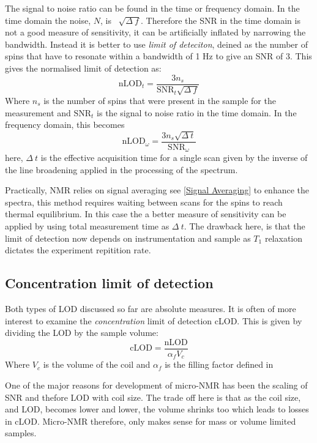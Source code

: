 The signal to noise ratio can be found in the time or frequency domain. In the time domain the noise, $N$, is
~$\sqrt{\Delta~f}$. Therefore the SNR in the time domain is not a good measure of sensitivity, it can be
artificially inflated by narrowing the bandwidth. Instead it is better to use \textit{limit of deteciton}, deined as
the number of spins that have to resonate within a bandwidth of 1 Hz to give an SNR of 3. This gives
the normalised limit of detection as\citep{Badilita:2011td}:
\begin{equation}
  \text{nLOD}_{t} = \frac{3n_s}{\text{SNR}_{t}\sqrt{\Delta~f}}
\end{equation}
Where $n_s$ is the number of spins that were present in the sample for the measurement and $\text{SNR}_t$ is the
signal to noise ratio in the time domain.
In the frequency domain, this becomes
\begin{equation}\label{eqn:nLOD}
  \text{nLOD}_\omega = \frac{3n_s\sqrt{\Delta~t}}{\text{SNR}_\omega}
\end{equation}
here, $\Delta~t$ is the effective acquisition time for a single scan given by the inverse of the
line broadening applied in the processing of the spectrum.

Practically, NMR relies on signal averaging see \ref{Signal Averaging} to enhance the spectra, this
method requires waiting between scans for the spins to reach thermal equilibrium. In
this case the a better measure of sensitivity can be applied by using total measurement time
as $\Delta~t$. The drawback here, is that the limit of detection now depends on instrumentation
and sample as $T_1$ relaxation dictates the experiment repitition rate.

\subsection{Concentration limit of detection}

Both types of LOD discussed so far are absolute measures. It is often of more
interest to examine the \textit{concentration} limit of detection cLOD. This is given by
dividing the LOD by the sample volume:
\begin{equation}\label{eqn:cLOD}
  \text{cLOD} = \frac{\text{nLOD}}{\alpha_fV_c}
\end{equation}
Where $V_c$ is the volume of the coil and $\alpha_f$ is the filling factor defined in 

One of the major reasons for development of micro-NMR has been the scaling of SNR and thefore LOD
with coil size. The trade off here is that as the coil size, and LOD, becomes lower and lower, the
volume shrinks too which leads to losses in cLOD. Micro-NMR therefore, only makes sense for mass
or volume limited samples.

